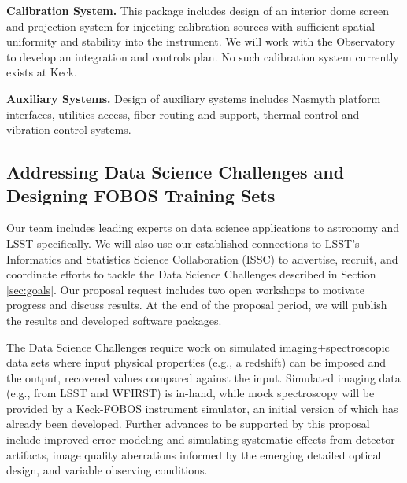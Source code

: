 \documentclass[oneside,11pt]{amsart}
\newcommand{\comment}[2][todo]{{\color{#1}[[{\bf #2}]]}}
\begin{document}
\noindent \textbf{Calibration System.} This package includes design of an interior dome screen and projection system for injecting calibration sources with sufficient spatial uniformity and stability into the instrument.  We will work with the Observatory to develop an integration and controls plan.  No such calibration system currently exists at Keck.

\noindent \textbf{Auxiliary Systems.} Design of auxiliary systems includes Nasmyth platform interfaces, utilities access, fiber routing and support, thermal control and vibration control systems.


\subsection{Addressing Data Science Challenges and Designing FOBOS Training Sets}
\label{sec:survey}

Our team includes leading experts on data science applications to astronomy and LSST specifically.  We will also use
our established connections to LSST's Informatics and Statistics Science Collaboration (ISSC) to advertise, recruit,
and coordinate efforts to tackle the Data Science Challenges described in Section \ref{sec:goals}.  Our proposal
request includes two open workshops to motivate progress and discuss results. At the end of the proposal period, we
will publish the results and developed software packages.

The Data Science Challenges require work on simulated imaging$+$spectroscopic data sets where input physical properties
(e.g., a redshift) can be imposed and the output, recovered values compared against the input.  Simulated imaging data
(e.g., from LSST and WFIRST) is in-hand, while mock spectroscopy will be provided by a Keck-FOBOS instrument simulator,
an initial version of which has already been developed.  Further advances to be supported by this proposal include
improved error modeling and simulating systematic effects from detector artifacts, image quality aberrations informed
by the emerging detailed optical design, and variable observing conditions.
\end{document}

